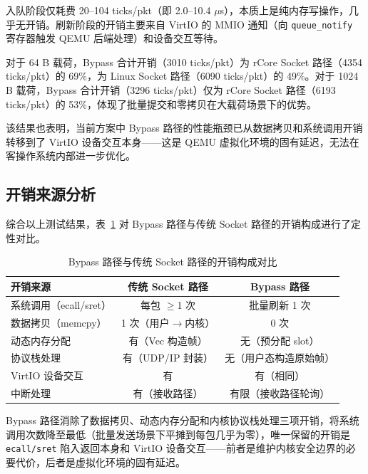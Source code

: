 入队阶段仅耗费 20--104 ticks/pkt（即 2.0--10.4 $\mu$s），本质上是纯内存写操作，几乎无开销。刷新阶段的开销主要来自 VirtIO 的 MMIO 通知（向 \texttt{queue\_notify} 寄存器触发 QEMU 后端处理）和设备交互等待。

对于 64 B 载荷，Bypass 合计开销（3010 ticks/pkt）为 rCore Socket 路径（4354 ticks/pkt）的 69\%，为 Linux Socket 路径（6090 ticks/pkt）的 49\%。对于 1024 B 载荷，Bypass 合计开销（3296 ticks/pkt）仅为 rCore Socket 路径（6193 ticks/pkt）的 53\%，体现了批量提交和零拷贝在大载荷场景下的优势。

该结果也表明，当前方案中 Bypass 路径的性能瓶颈已从数据拷贝和系统调用开销转移到了 VirtIO 设备交互本身——这是 QEMU 虚拟化环境的固有延迟，无法在客操作系统内部进一步优化。

\subsection{开销来源分析}

综合以上测试结果，表~\ref{tab:overhead} 对 Bypass 路径与传统 Socket 路径的开销构成进行了定性对比。

\begin{table}[htbp]
    \centering
    \caption{Bypass 路径与传统 Socket 路径的开销构成对比}
    \label{tab:overhead}
    \begin{tabular}{lcc}
        \toprule
        开销来源 & 传统 Socket 路径 & Bypass 路径 \\
        \midrule
        系统调用（ecall/sret）    & 每包 $\geq$1 次       & 批量刷新 1 次 \\
        数据拷贝（memcpy）        & 1 次（用户$\to$内核）     & 0 次 \\
        动态内存分配              & 有（Vec 构造帧）      & 无（预分配 slot） \\
        协议栈处理                & 有（UDP/IP 封装）     & 无（用户态构造原始帧） \\
        VirtIO 设备交互           & 有                    & 有（相同） \\
        中断处理                  & 有（接收路径）        & 有限（接收路径轮询） \\
        \bottomrule
    \end{tabular}
\end{table}

Bypass 路径消除了数据拷贝、动态内存分配和内核协议栈处理三项开销，将系统调用次数降至最低（批量发送场景下平摊到每包几乎为零），唯一保留的开销是 \texttt{ecall/sret} 陷入返回本身和 VirtIO 设备交互——前者是维护内核安全边界的必要代价，后者是虚拟化环境的固有延迟。



